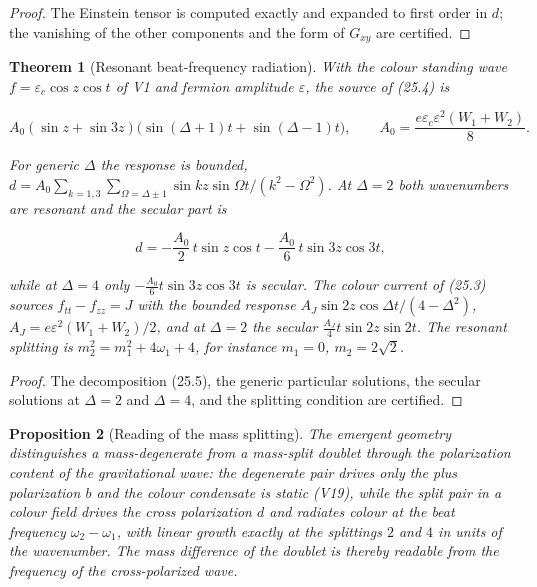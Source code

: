\documentclass[11pt]{article}
\newtheorem{theorem}{Theorem}[section]
\newtheorem{proposition}[theorem]{Proposition}
\theoremstyle{remark}
\begin{document}
\begin{proof}
The Einstein tensor is computed exactly and expanded to first order in
\(d\); the vanishing of the other components and the form of
\(G_{xy}\) are certified.
\end{proof}

\begin{theorem}[Resonant beat-frequency radiation]
\label{thm:v20v22-resonance}
With the colour standing wave \(f=\varepsilon_c\cos z\cos t\) of V1 and
fermion amplitude \(\varepsilon\), the source of (25.4) is

\[
 A_0(\sin z+\sin3z)\bigl(\sin(\Delta+1)t+\sin(\Delta-1)t\bigr),\qquad
 A_0=\frac{e\varepsilon_c\varepsilon^2(W_1+W_2)}8.                     \tag{25.5}
\]

For generic \(\Delta\) the response is bounded,
\(d=A_0\sum_{k=1,3}\sum_{\Omega=\Delta\pm1}\sin kz\sin\Omega t/(k^2-\Omega^2)\).
At \(\Delta=2\) both wavenumbers are resonant and the secular part is

\[
 d=-\frac{A_0}2\,t\sin z\cos t-\frac{A_0}6\,t\sin3z\cos3t,             \tag{25.6}
\]

while at \(\Delta=4\) only \(-\tfrac{A_0}6t\sin3z\cos3t\) is secular.
The colour current of (25.3) sources \(f_{tt}-f_{zz}=J\) with the
bounded response \(A_J\sin2z\cos\Delta t/(4-\Delta^2)\),
\(A_J=e\varepsilon^2(W_1+W_2)/2\), and at \(\Delta=2\) the secular
\(\tfrac{A_J}4t\sin2z\sin2t\).  The resonant splitting is
\(m_2^2=m_1^2+4\omega_1+4\), for instance \(m_1=0\), \(m_2=2\sqrt2\).
\end{theorem}

\begin{proof}
The decomposition (25.5), the generic particular solutions, the
secular solutions at \(\Delta=2\) and \(\Delta=4\), and the splitting
condition are certified.
\end{proof}

\begin{proposition}[Reading of the mass splitting]
\label{prop:v20v22-reading}
The emergent geometry distinguishes a mass-degenerate from a
mass-split doublet through the polarization content of the
gravitational wave: the degenerate pair drives only the plus
polarization \(b\) and the colour condensate is static (V19), while
the split pair in a colour field drives the cross polarization \(d\)
and radiates colour at the beat frequency \(\omega_2-\omega_1\), with
linear growth exactly at the splittings \(2\) and \(4\) in units of the
wavenumber.  The mass difference of the doublet is thereby readable
from the frequency of the cross-polarized wave.
\end{proposition}
\end{document}
